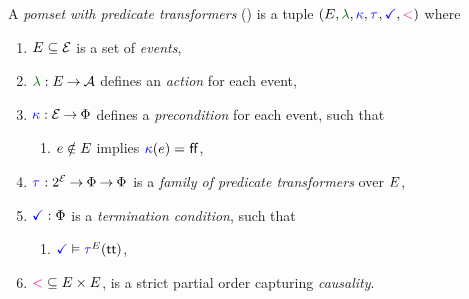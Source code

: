 A \emph{pomset with predicate transformers} (\PwT) %
is a tuple $(\aEvs, \labeling, \labelingForm, \aTr{}{}, \aTerm, {\lt})$ where
\begin{enumerate}[,label=(\textsc{m}\arabic*),ref=\textsc{m}\arabic*]
\item \label{pom-E} 
  $E\subseteq\mathcal{E}$ is a set of \emph{events},
\item \label{pom-lambda} 
  $\labeling: \aEvs \fun \Act$ defines an \emph{action} for each event,
\item \label{pom-kappa} 
  ${\color{blue}\kappa}:\mathcal{E}\mathbin\rightarrow\Phi$ defines a \emph{precondition} for each event,
  such that
  \begin{enumerate}
  \item \label{pom-kappa-sat}
    $e\notin E$ implies ${\color{blue}\kappa}(e)=\mkern.6mu\mathsf{ff}\mkern.6mu$,
  \end{enumerate}
\item \label{pom-tau} 
  $\aTr{}{}:2^{\AllEvents}\fun\Formulae \fun\Formulae$ is a \emph{family of predicate transformers} over $E$, 
\item \label{pom-term} 
  $\aTerm:\Formulae$ is a \emph{termination condition}, such that 
  \begin{enumerate}
  \item \label{pom-term-tau}
    $\aTerm\rimplies\aTrAbbrv{\aEvs}{\TRUE}$,
  \end{enumerate}
\item \label{pom-le} 
  ${\mathrel{{\color{magenta}<}}} \subseteq E\times E$, is a strict partial order capturing
  \emph{causality}.
\end{enumerate}
